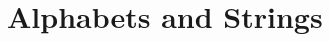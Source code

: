 
\label{chapter:Languages-Encodings-and-Problems}







\section{Alphabets and Strings}
\label{section:Alphabets-and-Strings}


